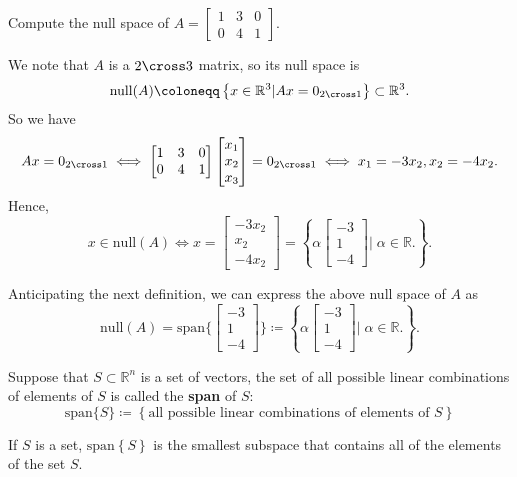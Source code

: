 \begin{problem}
	Compute the null space of \(A = \begin{bmatrix}
		1 & 3 & 0 \\
		0 & 4 & 1
	\end{bmatrix}\).
\end{problem}
\begin{answer}
	We note that \(A\) is a \(2 \cross 3\) matrix, so its null space is
	\[
		\text{null} (A) \coloneqq \left\{  x \in \mathbb{R} ^3 | Ax = 0_{2 \cross 1} \right\} \subset \mathbb{R} ^3.
	\]
	So we have
	\[
		Ax = 0_{2 \cross 1} \iff
		\begin{bmatrix}
			1 & 3 & 0 \\
			0 & 4 & 1
		\end{bmatrix}
		\begin{bmatrix}
			x_1 \\ x_2 \\ x_3
		\end{bmatrix} =
		0_{2 \cross 1} \iff
		x_1 = -3x_2, x_2 = -4x_2.
	\]
	Hence,
	\[
		x \in \text{null} (A) \iff x =
		\begin{bmatrix}
			-3x_2 \\ x_2 \\ -4x_2
		\end{bmatrix} = \left\{ 
			\alpha 
			\begin{bmatrix}
				-3 \\ 1 \\ -4
			\end{bmatrix}
			| \; \alpha  \in \mathbb{R}.
		 \right\}.
	\]
\end{answer}
\begin{remark}
	Anticipating the next definition, we can express the above null space of \(A\) as
	\[
		\text{null} (A) = \text{span} \{ \begin{bmatrix}
			-3 \\ 1 \\ -4 
		\end{bmatrix} \} \coloneqq 
		\left\{ 
			\alpha 
			\begin{bmatrix}
				-3 \\ 1 \\ -4
			\end{bmatrix}
			| \; \alpha  \in \mathbb{R}.
		 \right\}.
	\]
\end{remark}

\begin{definition}[Span]
	Suppose that \(S \subset \mathbb{R} ^n\) is a set of vectors, the set of all possible linear combinations of elements of \(S\) is called the \textbf{span} of \(S\):
	\[
		\text{span} \{S\} \coloneqq \left\{ \text{all possible linear combinations of elements of \(S\)}  \right\} 
	\] 
	\begin{remark}
		If \(S\) is a set, \(\text{span} \left\{ S \right\} \) is the smallest subspace that contains all of the elements of the set \(S\).
	\end{remark}
\end{definition}

